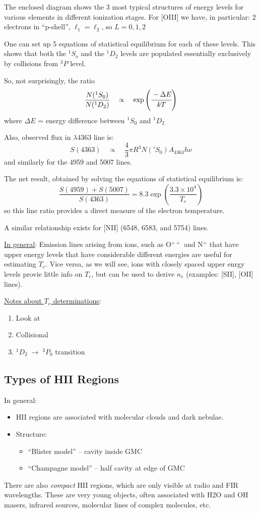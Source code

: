 \documentclass[12pt]{article}
\newcommand{\mar}[1]{\hspace{0pt}\marginpar{-\textcolor{black}{#1}-}}
\begin{document}
The enclosed diagram shows the 3 most typical structures of energy
levels for various elements in different ionization stages.
For [OIII] we have, in particular: 2 electrons in ``p-shell'',
$\ell_{1} = \ell_{2}$, so $L = 0, 1, 2$

\mar{81}One can set up 5 equations of statistical equilibrium for each
of these levels. This shows that both the $^{1}S_{o}$ and the
$^{1}D_{2}$ levels are populated essentially exclusively by collisions
from $^{3}P$ level.

So, not surprisingly, the ratio
$${
\frac{N(^{1}S_{0})}{N(^{1}D_{2})}\quad\propto\quad
\exp\left(\cfrac{-\Delta{E}}{kT}\right)
}$$
where $\Delta{E}$ = energy difference between
$^{1}S_{0}$ and $^{1}D_{2}$

Also, observed flux in $\lambda$4363 line is:
$${
    S(4363) \quad\propto\quad \frac{4}{3}\pi{R^{3}}N('S_{0})A_{4363}h\nu
}$$
and similarly for the 4959 and 5007 lines.

The net result, obtained by solving the equations of statistical
equilibrium is:
$${
    \frac{S(4959)+S(5007)}{S(4363)} =
    8.3\exp\left(\frac{3.3\times10^{4}}{T_{e}}\right)
}$$
so this line ratio provides a direct measure of the electron
temperature.

A similar relationship exists for
[NII] (6548, 6583, and 5754) lines.

\underline{In general}: Emission lines arising from ions, such as
O$^{++}$ and N$^{+}$ that have upper energy levels that have considerable
different energies are useful for estimating $T_{e}$. Vice versa,
as we will see, ions with closely spaced upper enrgy levels provie
little info on $T_{e}$, but can be used to derive $n_{e}$
(examples: [SII], [OII] lines).

\underline{Notes about $T_{e}$ determinations}:
\begin{enumerate}
    \item Look at
    \item Collisional
    \item $^{1}D_{2} \;\rightarrow\; ^{3}P_{0} $ transition
\end{enumerate}

\subsection{Types of HII Regions}
\mar{85}In general:
\begin{itemize}
    \item HII regions are associated with molecular clouds and dark
        nebulae.
    \item Structure:
        \begin{itemize}
            \item ``Blister model'' -- cavity inside GMC
            \item ``Champagne model'' -- half cavity at edge of GMC
        \end{itemize}
\end{itemize}
There are also \emph{compact} HII regions, which are only visible at
radio and FIR wavelengths. These are very young objects, often associated
with H2O and OH masers, infrared sources, molecular lines of complex
molecules, etc.
\end{document}
